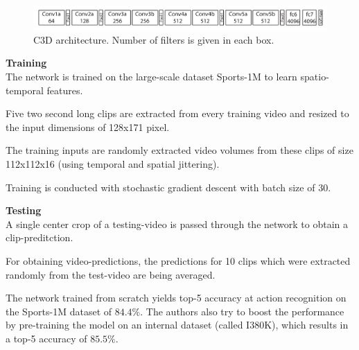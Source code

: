 \begin{figure}[H]
    \centering
    \includegraphics[width=\textwidth]{img_deep/c3d_architecture}
    \caption{C3D architecture. Number of filters is given in each box. \cite{tran_learning_2015}}
    \label{fig:c3d_architecture}
\end{figure}

\textbf{Training} \\
The network is trained on the large-scale dataset Sports-1M to learn spatio-temporal features.

Five two second long clips are extracted from every training video and resized to the input dimensions of 128x171 pixel.

The training inputs are randomly extracted video volumes from these clips of size 112x112x16 (using temporal and spatial jittering).

Training is conducted with stochastic gradient descent with batch size of 30.

\textbf{Testing} \\
A single center crop of a testing-video is passed through the network to obtain a clip-preditction.

For obtaining video-predictions, the predictions for 10 clips which were extracted randomly from the test-video are being averaged.

The network trained from scratch yields top-5 accuracy at action recognition on the Sports-1M dataset of $84.4\%$. The authors also try to boost the performance by pre-training the model on an internal dataset (called I380K), which results in a top-5 accuracy of $85.5\%$.

